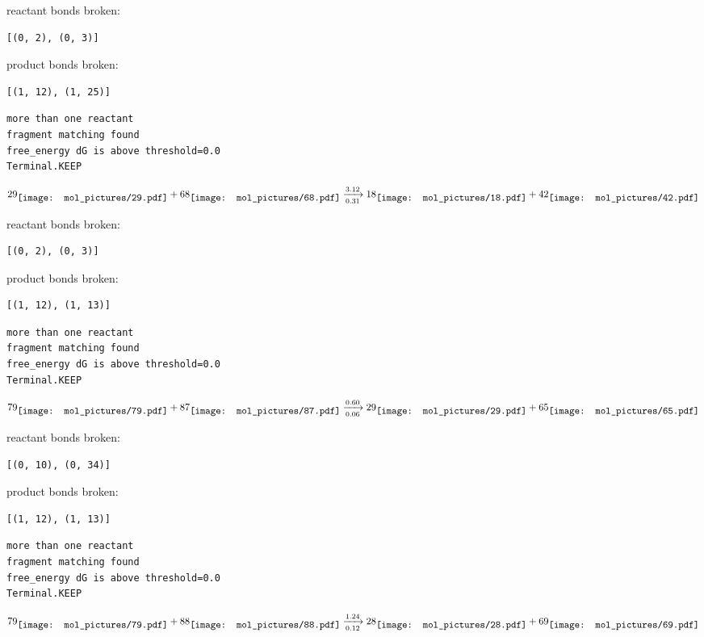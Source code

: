 \documentclass{article}
\begin{document}
reactant bonds broken:\begin{verbatim}
[(0, 2), (0, 3)]
\end{verbatim}
product bonds broken:\begin{verbatim}
[(1, 12), (1, 25)]
\end{verbatim}




\vspace{1cm}
\begin{verbatim}
more than one reactant
fragment matching found
free_energy dG is above threshold=0.0
Terminal.KEEP
\end{verbatim}
$$
29
\raisebox{-.5\height}{\texttt{[image: mol\_pictures/29.pdf]}}
+
68
\raisebox{-.5\height}{\texttt{[image: mol\_pictures/68.pdf]}}
\xrightarrow[0.31]{3.12}
18
\raisebox{-.5\height}{\texttt{[image: mol\_pictures/18.pdf]}}
+
42
\raisebox{-.5\height}{\texttt{[image: mol\_pictures/42.pdf]}}
$$


reactant bonds broken:\begin{verbatim}
[(0, 2), (0, 3)]
\end{verbatim}
product bonds broken:\begin{verbatim}
[(1, 12), (1, 13)]
\end{verbatim}




\vspace{1cm}
\begin{verbatim}
more than one reactant
fragment matching found
free_energy dG is above threshold=0.0
Terminal.KEEP
\end{verbatim}
$$
79
\raisebox{-.5\height}{\texttt{[image: mol\_pictures/79.pdf]}}
+
87
\raisebox{-.5\height}{\texttt{[image: mol\_pictures/87.pdf]}}
\xrightarrow[0.06]{0.60}
29
\raisebox{-.5\height}{\texttt{[image: mol\_pictures/29.pdf]}}
+
65
\raisebox{-.5\height}{\texttt{[image: mol\_pictures/65.pdf]}}
$$


reactant bonds broken:\begin{verbatim}
[(0, 10), (0, 34)]
\end{verbatim}
product bonds broken:\begin{verbatim}
[(1, 12), (1, 13)]
\end{verbatim}




\vspace{1cm}
\begin{verbatim}
more than one reactant
fragment matching found
free_energy dG is above threshold=0.0
Terminal.KEEP
\end{verbatim}
$$
79
\raisebox{-.5\height}{\texttt{[image: mol\_pictures/79.pdf]}}
+
88
\raisebox{-.5\height}{\texttt{[image: mol\_pictures/88.pdf]}}
\xrightarrow[0.12]{1.24}
28
\raisebox{-.5\height}{\texttt{[image: mol\_pictures/28.pdf]}}
+
69
\raisebox{-.5\height}{\texttt{[image: mol\_pictures/69.pdf]}}
$$
\end{document}
